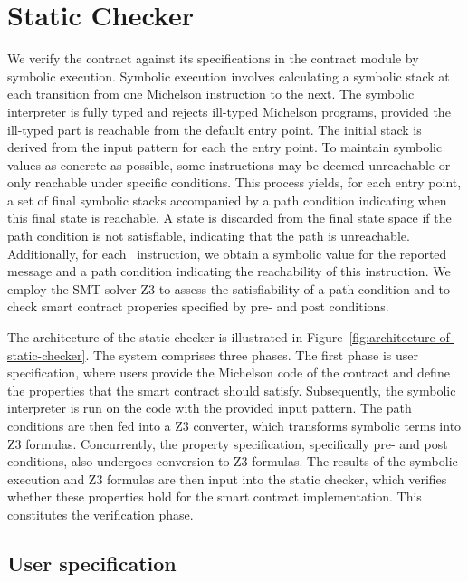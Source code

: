 \documentclass[a4paper,USenglish,cleveref, autoref, thm-restate]{lipics-v2021}
\begin{document}
\section{Static Checker}
\label{sec:static-checker-we}

We verify the contract against its specifications in the contract
module by symbolic execution. Symbolic execution involves calculating
a symbolic stack at each transition from one Michelson instruction to
the next. The symbolic interpreter is fully typed and rejects
ill-typed Michelson programs, provided the ill-typed part is reachable
from the default entry point.  The initial stack is derived from the
input pattern for each the entry point. To maintain symbolic values as
concrete as possible, some instructions may be deemed unreachable or
only reachable under specific conditions. This process yields, for
each entry point, a set of final symbolic stacks accompanied by a path
condition indicating when this final state is reachable. A state is
discarded from the final state space if the path condition is not
satisfiable, indicating that the path is unreachable. Additionally,
for each \FAILWITH\ instruction, we obtain a symbolic value for the
reported message and a path condition indicating the reachability of
this instruction. We employ the SMT solver Z3  to assess the
satisfiability of a path condition and to check smart contract
properies specified by pre- and post conditions.

The architecture of the static checker is illustrated in
Figure~\ref{fig:architecture-of-static-checker}. The system comprises
three phases. The first phase is user specification, where users
provide the Michelson code of the contract and define the properties
that the smart contract should satisfy. Subsequently, the symbolic
interpreter is run on the code with the provided input pattern.  The
path conditions are then fed into a Z3 converter, which transforms
symbolic terms into Z3 formulas. Concurrently, the property
specification, specifically pre- and post conditions, also undergoes
conversion to Z3 formulas. The results of the symbolic execution and
Z3 formulas are then input into the static checker, which verifies
whether these properties hold for the smart contract
implementation. This constitutes the verification phase. 

\subsection{User specification}
\label{sec:user-specification}
\end{document}
